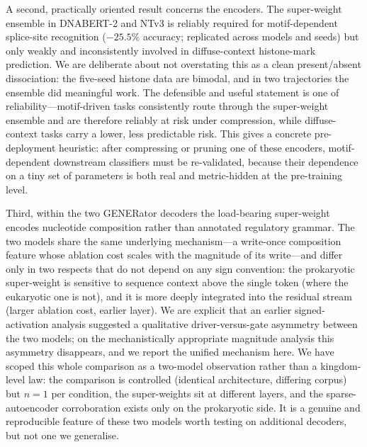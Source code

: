 \documentclass[11pt]{article}
\begin{document}
A second, practically oriented result concerns the encoders. The
super-weight ensemble in DNABERT-2 and NTv3 is reliably required for
motif-dependent splice-site recognition ($-25.5\%$ accuracy; replicated
across models and seeds) but only weakly and inconsistently involved in
diffuse-context histone-mark prediction. We are deliberate about not
overstating this as a clean present/absent dissociation: the five-seed
histone data are bimodal, and in two trajectories the ensemble did
meaningful work. The defensible and useful statement is one of
reliability---motif-driven tasks consistently route through the
super-weight ensemble and are therefore reliably at risk under
compression, while diffuse-context tasks carry a lower, less predictable
risk. This gives a concrete pre-deployment heuristic: after compressing
or pruning one of these encoders, motif-dependent downstream classifiers
must be re-validated, because their dependence on a tiny set of
parameters is both real and metric-hidden at the pre-training level.

Third, within the two GENERator decoders the load-bearing super-weight
encodes nucleotide composition rather than annotated regulatory grammar.
The two models share the same underlying mechanism---a write-once
composition feature whose ablation cost scales with the magnitude of its
write---and differ only in two respects that do not depend on any sign
convention: the prokaryotic super-weight is sensitive to sequence
context above the single token (where the eukaryotic one is not), and it
is more deeply integrated into the residual stream (larger ablation
cost, earlier layer). We are explicit that an earlier signed-activation
analysis suggested a qualitative driver-versus-gate asymmetry between the
two models; on the mechanistically appropriate magnitude analysis this
asymmetry disappears, and we report the unified mechanism here. We have
scoped this whole comparison as a two-model observation rather than a
kingdom-level law: the comparison is controlled (identical architecture,
differing corpus) but $n=1$ per condition, the super-weights sit at
different layers, and the sparse-autoencoder corroboration exists only
on the prokaryotic side. It is a genuine and reproducible feature of
these two models worth testing on additional decoders, but not one we
generalise.
\end{document}
